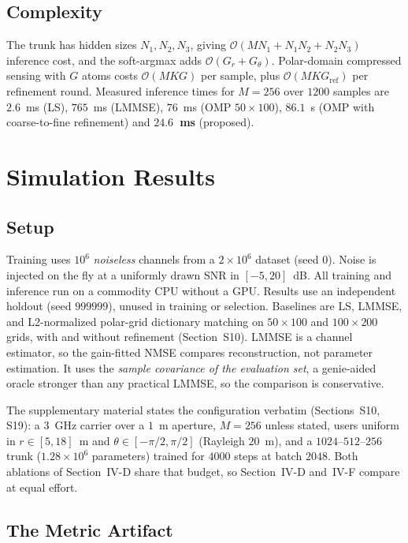 \documentclass[journal]{IEEEtran}
\begin{document}
\subsection{Complexity}

The trunk has hidden sizes $N_1,N_2,N_3$, giving $\mathcal{O}(M N_1 + N_1N_2 + N_2N_3)$ inference cost, and the soft-argmax adds $\mathcal{O}(G_r + G_\theta)$. Polar-domain compressed sensing with $G$ atoms costs $\mathcal{O}(MKG)$ per sample, plus $\mathcal{O}(MKG_{\mathrm{ref}})$ per refinement round. Measured inference times for $M=256$ over $1200$ samples are $2.6$~ms (LS), $765$~ms (LMMSE), $76$~ms (OMP $50\times100$), $86.1$~s (OMP with coarse-to-fine refinement) and \textbf{$24.6$~ms} (proposed).

\section{Simulation Results}

\subsection{Setup}

Training uses $10^{6}$ \emph{noiseless} channels from a $2\times10^{6}$ dataset (seed $0$). Noise is injected on the fly at a uniformly drawn SNR in $[-5,20]$~dB. All training and inference run on a commodity CPU without a GPU. Results use an independent holdout (seed $999999$), unused in training or selection. Baselines are LS, LMMSE, and L2-normalized polar-grid dictionary matching on $50\times100$ and $100\times200$ grids, with and without refinement (Section~S10). LMMSE is a channel estimator, so the gain-fitted NMSE compares reconstruction, not parameter estimation. It uses the \emph{sample covariance of the evaluation set}, a genie-aided oracle stronger than any practical LMMSE, so the comparison is conservative.

The supplementary material states the configuration verbatim (Sections~S10, S19): a $3$~GHz carrier over a $1$~m aperture, $M=256$ unless stated, users uniform in $r\in[5,18]$~m and $\theta\in[-\pi/2,\pi/2]$ (Rayleigh $20$~m), and a $1024$--$512$--$256$ trunk ($1.28\times10^{6}$ parameters) trained for $4000$ steps at batch $2048$. Both ablations of Section~IV-D share that budget, so Section~IV-D and~IV-F compare at equal effort.

\subsection{The Metric Artifact}
\end{document}
